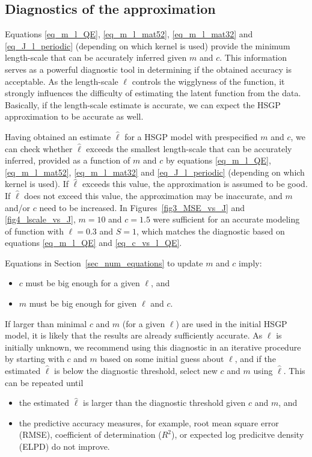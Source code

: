 \subsection{Diagnostics of the approximation} \label{subsec_diagnostics}

Equations \eqref{eq_m_l_QE}, \eqref{eq_m_l_mat52}, \eqref{eq_m_l_mat32} and \eqref{eq_J_l_periodic} (depending on which kernel is used) provide the minimum length-scale that can be accurately inferred given $m$ and $c$. This information serves as a powerful diagnostic tool in determining if the obtained accuracy is acceptable. As the length-scale $\ell$ controls the wigglyness of the function, it strongly influences the difficulty of estimating the latent function from the data. Basically, if the length-scale estimate is accurate, we can expect the HSGP approximation to be accurate as well.

Having obtained an estimate $\hat{\ell}$ for a HSGP model with prespecified $m$ and $c$, we can check whether $\hat{\ell}$ exceeds the smallest length-scale that can be accurately inferred, provided as a function of $m$ and $c$ by equations \eqref{eq_m_l_QE}, \eqref{eq_m_l_mat52}, \eqref{eq_m_l_mat32} and \eqref{eq_J_l_periodic} (depending on which kernel is used). If $\hat{\ell}$ exceeds this value, the approximation is assumed to be good. If $\hat{\ell}$ does not exceed this value, the approximation may be inaccurate, and $m$ and/or $c$ need to be increased. In Figures~\ref{fig3_MSE_vs_J} and \ref{fig4_lscale_vs_J}, $m = 10$ and $c = 1.5$ were sufficient for an accurate modeling of function with $\ell = 0.3$ and $S=1$, which matches the diagnostic based on equations \eqref{eq_m_l_QE} and \eqref{eq_c_vs_l_QE}.

Equations in Section~\ref{sec_num_equations} to update $m$ and $c$ imply:
% 
\begin{itemize}
	\item $c$ must be big enough for a given $\ell$, and
	\item $m$ must be big enough for given $\ell$ and $c$. 
\end{itemize}
%
If larger than minimal $c$ and $m$ (for a given $\ell$) are used in the initial HSGP model, it is likely that the results are already sufficiently accurate. As $\ell$ is initially unknown, we recommend using this diagnostic in an iterative procedure by starting with $c$ and $m$ based on some initial guess about $\ell$, and if the estimated $\hat{\ell}$ is below the diagnostic threshold, select new $c$ and $m$ using $\hat{\ell}$. This can be repeated until
%
\begin{itemize}
\item the estimated $\hat{\ell}$ is larger than the diagnostic threshold given $c$ and $m$, and
\item the predictive accuracy measures, for example, root mean square error (RMSE), coefficient of determination ($R^2$), or expected log predicitve density (ELPD) do not improve.
\end{itemize}

